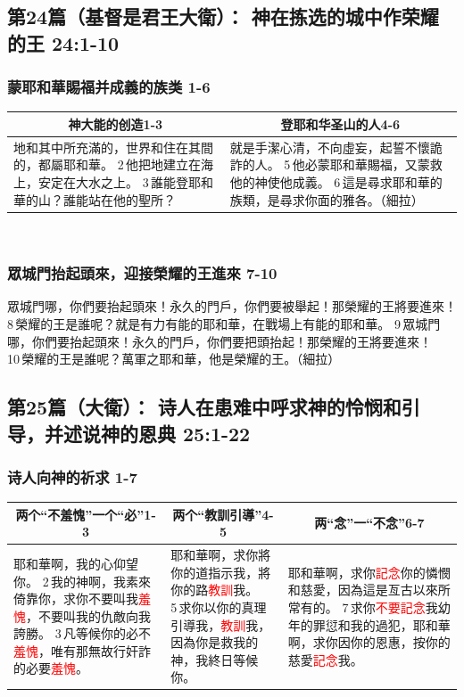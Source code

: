 \subsection{第24篇（基督是君王大衛）： 神在拣选的城中作荣耀的王 24:1-10}
\subsubsection{蒙耶和華賜福并成義的族类 1-6}
\begin{table}[H]
\centering
\begin{tabular}{p{8cm}|p{8.5cm}}\hline\hline
\multicolumn{1}{c|}{神大能的创造1-3}&\multicolumn{1}{c}{登耶和华圣山的人4-6}\\\hline
地和其中所充滿的，世界和住在其間的，都屬耶和華。
2 他把地建立在海上，安定在大水之上。
3 誰能登耶和華的山？誰能站在他的聖所？
&就是手潔心清，不向虛妄，起誓不懷詭詐的人。
5 他必蒙耶和華賜福，又蒙救他的神使他成義。
6 這是尋求耶和華的族類，是尋求你面的雅各。（細拉）\\\hline
\end{tabular}
\end{table} 

\subsubsection{眾城門抬起頭來，迎接榮耀的王進來 7-10}
眾城門哪，你們要抬起頭來！永久的門戶，你們要被舉起！那榮耀的王將要進來！
8 榮耀的王是誰呢？就是有力有能的耶和華，在戰場上有能的耶和華。
9 眾城門哪，你們要抬起頭來！永久的門戶，你們要把頭抬起！那榮耀的王將要進來！
10 榮耀的王是誰呢？萬軍之耶和華，他是榮耀的王。（細拉）


\subsection{第25篇（大衛）： 诗人在患难中呼求神的怜悯和引导，并述说神的恩典 25:1-22}
\subsubsection{诗人向神的祈求 1-7}
\begin{table}[H]
\centering
\begin{tabular}{p{5.75cm}|p{5.00cm}|p{6.00cm}}\hline\hline
\multicolumn{1}{c|}{两个“不羞愧”一个“必”1-3}&\multicolumn{1}{c|}{两个“教訓引導”4-5}&\multicolumn{1}{c}{两“念”一“不念”6-7}\\\hline
耶和華啊，我的心仰望你。
2 我的神啊，我素來倚靠你，求你不要叫我\textcolor{red}{羞愧}，不要叫我的仇敵向我誇勝。
3 凡等候你的必不\textcolor{red}{羞愧}，唯有那無故行奸詐的必要\textcolor{red}{羞愧}。
&耶和華啊，求你將你的道指示我，將你的路\textcolor{red}{教訓}我。5 求你以你的真理引導我，\textcolor{red}{教訓}我，因為你是救我的神，我終日等候你。
&耶和華啊，求你\textcolor{red}{記念}你的憐憫和慈愛，因為這是亙古以來所常有的。
7 求你\textcolor{red}{不要記念}我幼年的罪愆和我的過犯，耶和華啊，求你因你的恩惠，按你的慈愛\textcolor{red}{記念}我。\\\hline
\end{tabular}
\end{table} 

